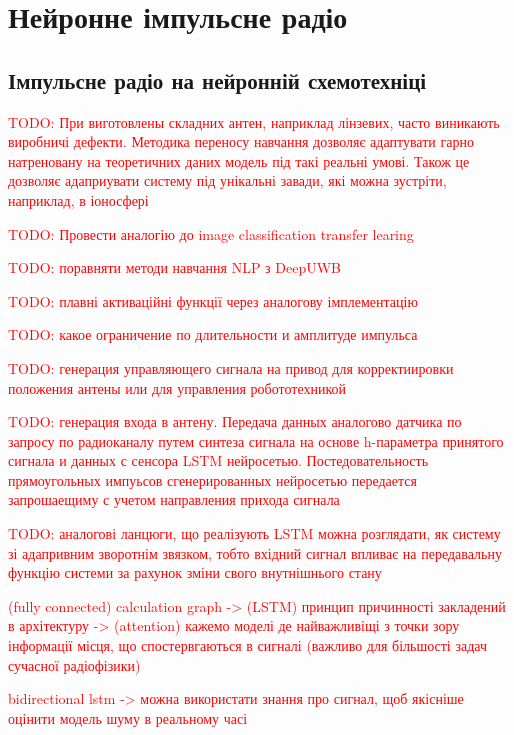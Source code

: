 \chapter{Нейронне імпульсне радіо}
\label{ch:neuron}

\section{Імпульсне радіо на нейронній схемотехніці}

\textcolor{red}{TODO: При виготовлены складних антен, наприклад лінзевих, часто
виникають виробничі дефекти. Методика переносу навчання дозволяє адаптувати 
гарно натреновану на теоретичних даних модель під такі реальні умові. Також
це дозволяє адаприувати систему під унікальні завади, які можна зустріти,
наприклад, в іоносфері}

\textcolor{red}{TODO: Провести аналогію до image classification transfer 
learing}

\textcolor{red}{TODO: поравняти методи навчання NLP з DeepUWB}

\textcolor{red}{TODO: плавні активаційні функції через аналогову імплементацію}

\textcolor{red}{TODO: какое ограничение по длительности и амплитуде импульса}

\textcolor{red}{TODO: генерация управляющего сигнала на привод для 
корректиировки положения антены или для управления робототехникой}

\textcolor{red}{TODO: генерация входа в антену. Передача данных аналогово 
датчика по запросу по радиоканалу путем синтеза сигнала на основе h-параметра
принятого сигнала и данных с сенсора LSTM нейросетью. Постедовательность 
прямоугольных импуьсов сгенерированных нейросетью передается запрошаещиму с 
учетом направления прихода сигнала}

\textcolor{red}{TODO: аналогові ланцюги, що реалізують LSTM можна розглядати, 
як систему зі адапривним зворотнім звязком, тобто вхідний сигнал впливає 
на передавальну функцію системи за рахунок зміни свого внутнішнього стану}

\textcolor{red}{ (fully connected) calculation graph -> (LSTM) принцип 
причинності закладений в архітектуру -> (attention) кажемо моделі де 
найважливіщі з точки зору інформації місця, що спостервгаються в сигналі 
(важливо для більшості задач сучасної радіофізики)

bidirectional lstm -> можна використати знання про сигнал, щоб якісніше 
оцінити модель шуму в реальному часі}

